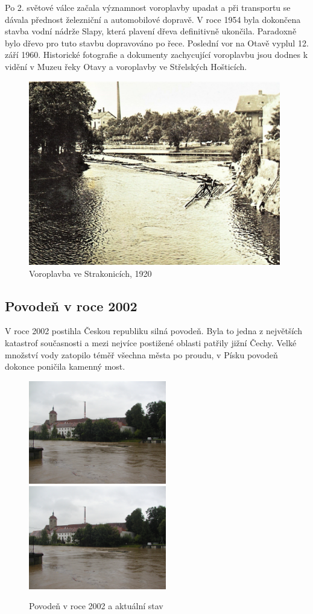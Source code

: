 \documentclass[thesis=M,czech]{FITthesis}[2012/06/26]
\begin{document}
Po 2. světové válce začala významnost voroplavby upadat a při transportu se dávala přednost železniční a automobilové dopravě. V roce 1954 byla dokončena stavba vodní nádrže Slapy, která plavení dřeva definitivně ukončila. Paradoxně bylo dřevo pro tuto stavbu dopravováno po řece. Poslední vor na Otavě vyplul 12. září 1960. Historické fotografie a dokumenty zachycující voroplavbu jsou dodnes k vidění v Muzeu řeky Otavy a voroplavby ve Střelských Hošticích. 
\clearpage
\begin{figure}[h!]
	\centering
	\includegraphics[width=11cm]{pics/voroplavba.jpg}
	\caption{Voroplavba ve Strakonicích, 1920}
	\label{obrazek:voroplavba}
\end{figure}


\subsection{Povodeň v roce 2002}
V roce 2002 postihla Českou republiku silná povodeň. Byla to jedna z největších katastrof současnosti a mezi nejvíce postižené oblasti patřily jižní Čechy. Velké množství vody zatopilo téměř všechna města po proudu, v Písku povodeň dokonce poničila kamenný most. 

\begin{figure}[htp]
\centering
\includegraphics[width=6cm]{pics/povoden1.jpg}
\includegraphics[width=6cm]{pics/povoden1.jpg}
\caption{Povodeň v roce 2002 a aktuální stav}
\label{obr:povoden_hrad}
\end{figure}
\end{document}
